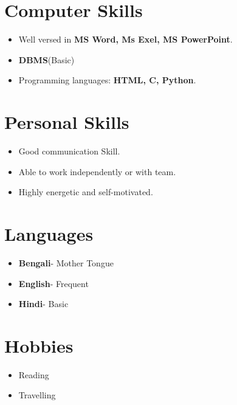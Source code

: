 \documentclass[12pt]{article}
\begin{document}
\section*{Computer Skills}
\begin{itemize}[leftmargin=0.5cm]
    \item Well versed in \textbf{MS Word, Ms Exel, MS PowerPoint}.
    \item \textbf{DBMS}(Basic)
    \item Programming languages: \textbf{ HTML, C, Python}.
\end{itemize}

\section*{Personal Skills}
\begin{itemize}[leftmargin=0.5cm]
    \item Good communication Skill. \\
    \item Able to work independently or with team.\\
    \item Highly energetic and self-motivated.
\end{itemize}

\section*{Languages}
\begin{itemize}[leftmargin=0.5cm]
    \item \textbf{Bengali}- Mother Tongue
    \item \textbf{English}- Frequent
    \item \textbf{Hindi}- Basic
\end{itemize}

\section*{Hobbies}
\begin{itemize}[leftmargin=0.5cm]
    \item Reading 
    \item Travelling
\end{itemize}
\end{document}
